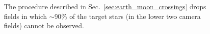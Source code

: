 \begin{appendices}
\begin{figure}[!t]
	\caption{The procedure described in Sec.~\protect\ref{sec:earth_moon_crossings} drops fields in which $\sim$90\% of the target stars (in the lower two camera fields) cannot be observed.}
	\label{fig:outage_vs_background}
\end{figure}

\end{appendices}
